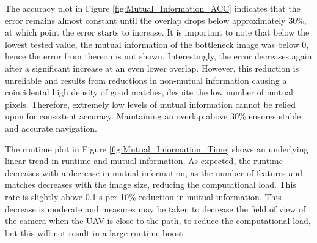 The accuracy plot in Figure \ref{fig:Mutual_Information_ACC} indicates that the error remains almost constant until the overlap drops below approximately 30\%, at which point the error starts to increase. It is important to note that below the lowest tested value, the mutual information of the bottleneck image was below 0, hence the error from thereon is not shown. Interestingly, the error decreases again after a significant increase at an even lower overlap. However, this reduction is unreliable and results from reductions in non-mutual information causing a coincidental high density of good matches, despite the low number of mutual pixels. Therefore, extremely low levels of mutual information cannot be relied upon for consistent accuracy. Maintaining an overlap above 30\% ensures stable and accurate navigation. 

The runtime plot in Figure \ref{fig:Mutual_Information_Time} shows an underlying linear trend in runtime and mutual information. As expected, the runtime decreases with a decrease in mutual information, as the number of features and matches decreases with the image size, reducing the computational load. This rate is slightly above 0.1 s per 10\% reduction in mutual information. This decrease is moderate and measures may be taken to decrease the field of view of the camera when the UAV is close to the path, to reduce the computational load, but this will not result in a large runtime boost.

